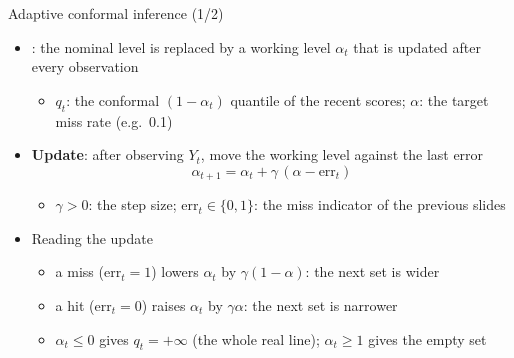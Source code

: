 \begin{frame}{Adaptive conformal inference (1/2)}
\itemsize{\small}
\begin{itemize}
    \item {}: the nominal level is replaced by a working level $\alpha_t$ that is updated after every observation
    \begin{itemize}
        \item $q_t$: the conformal $(1 - \alpha_t)$ quantile of the recent scores; $\alpha$: the target miss rate (e.g.\ 0.1)
    \end{itemize}
    \item \textbf{Update}: after observing $Y_t$, move the working level against the last error \[ \alpha_{t+1} = \alpha_t + \gamma\,(\alpha - \mathrm{err}_t) \]
    \begin{itemize}
        \item $\gamma > 0$: the step size; $\mathrm{err}_t \in \{0, 1\}$: the miss indicator of the previous slides
    \end{itemize}
    \item Reading the update
    \begin{itemize}
        \item a miss ($\mathrm{err}_t = 1$) lowers $\alpha_t$ by $\gamma(1 - \alpha)$: the next set is wider
        \item a hit ($\mathrm{err}_t = 0$) raises $\alpha_t$ by $\gamma\alpha$: the next set is narrower
        \item $\alpha_t \le 0$ gives $q_t = +\infty$ (the whole real line); $\alpha_t \ge 1$ gives the empty set
    \end{itemize}
\end{itemize}
\end{frame}

